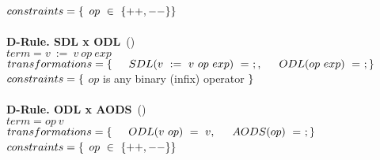 $constraints = \{ \\$ \indent $op~\in~\{++, --\}  \\ \}$
\\
\\
\textbf{D-Rule. SDL x ODL}~(\mujava{})\\
$term = v~:=~v~op~exp $\\
$transformations = \{\\ \indent SDL(v~:=~v~op~exp)~=~;,\\ \indent ODL(op~exp)~=~;\\\}$\\
$constraints = \{ \\$ \indent $op$ is any binary (infix) operator $\\ \}$
\\
\\
\textbf{D-Rule. ODL x AODS}~(\mujava{})\\
$term = op~v $\\
$transformations = \{\\ \indent ODL(v~op)~=~v,\\ \indent AODS(op)~=~;\\\}$\\
$constraints = \{ \\$ \indent $op~\in~\{++, --\}  \\ \}$
\\
\\
